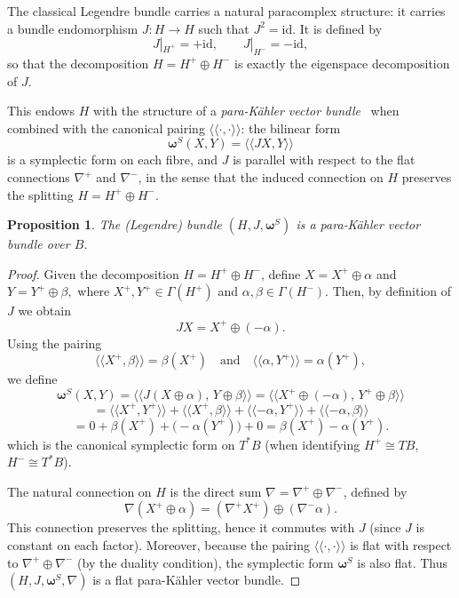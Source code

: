 \documentclass[12pt]{amsart}
\newtheorem{prop}{Proposition}
\begin{document}
The classical Legendre bundle carries a natural paracomplex structure: it carries a bundle endomorphism $J : H \to H$
such that $J^2 = \mathrm{id}$. It is defined by \begin{equation}\label{E:para} J|_{H^+} = +\mathrm{id}, \qquad J|_{H^-} = -\mathrm{id},\end{equation}
so that the decomposition $H = H^+ \oplus H^-$ is exactly the eigenspace decomposition of $J$.  

This endows $H$ with the structure of a \emph{para-Kähler vector bundle}~\cite{CM} when combined with the canonical pairing $\langle\!\langle \cdot, \cdot \rangle\!\rangle$: the bilinear form
\begin{equation}\label{E:symplectic}
    \boldsymbol{\omega}^S(X,Y) = \langle\!\langle JX, Y \rangle\!\rangle
\end{equation}
is a symplectic form on each fibre, and $J$ is parallel with respect to the flat connections $\nabla^+$ and $\nabla^-$, in the sense that the induced connection on $H$ preserves the splitting $H = H^+ \oplus H^-$.

\begin{prop}\label{P:ParaKahler}
The (Legendre) bundle $(H,J,\boldsymbol{\omega}^S)$ is a para‑Kähler vector bundle over $B$. 
\end{prop}
    \begin{proof}
Given the decomposition $H = H^+ \oplus H^-$, define $X = X^+ \oplus \alpha$ and $Y = Y^+ \oplus \beta,$ where $X^+, Y^+ \in \Gamma(H^+)$ and $\alpha, \beta \in \Gamma(H^-)$. Then,
by definition of $J$ we obtain \[
JX = X^+ \oplus (-\alpha).
\]
Using the pairing
\[
\langle\!\langle X^+, \beta \rangle\!\rangle = \beta(X^+)
\quad \text{and} \quad
\langle\!\langle \alpha, Y^+ \rangle\!\rangle = \alpha(Y^+),
\]
we define  $$\boldsymbol{\omega}^S(X,Y)=\langle\!\langle 
 J(X \oplus \alpha),\, Y \oplus \beta \rangle\!\rangle
= \langle\!\langle X^+ \oplus (-\alpha),\, Y^+ \oplus \beta \rangle\!\rangle$$ \[
= \langle\!\langle X^+, Y^+ \rangle\!\rangle
+ \langle\!\langle X^+, \beta \rangle\!\rangle
+ \langle\!\langle -\alpha, Y^+ \rangle\!\rangle
+ \langle\!\langle -\alpha, \beta \rangle\!\rangle
\]
\[
= 0 + \beta(X^+) + \bigl(-\alpha(Y^+)\bigr) + 0
= \beta(X^+) - \alpha(Y^+).
\] which is the canonical symplectic form on $T^*B$ (when identifying $H^+ \cong TB$, $H^- \cong T^*B$).



The natural connection on $H$ is the direct sum $\nabla = \nabla^+ \oplus \nabla^-$, defined by
\[
\nabla(X^+ \oplus \alpha) = (\nabla^+ X^+) \oplus (\nabla^- \alpha).
\]
This connection preserves the splitting, hence it commutes with $J$ (since $J$ is constant on each factor). Moreover, because the pairing $\langle\!\langle \cdot, \cdot \rangle\!\rangle$ is flat with respect to $\nabla^+ \oplus \nabla^-$ (by the duality condition), the symplectic form $\boldsymbol{\omega}^S$ is also flat. Thus $(H, J, \boldsymbol{\omega}^S, \nabla)$ is a flat para-Kähler vector bundle.

    \end{proof}
\end{document}
